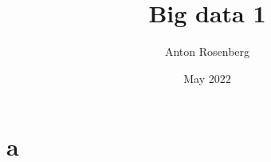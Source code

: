 \documentclass{article}
\title{Big data 1}
\author{Anton Rosenberg}
\date{May 2022}
\begin{document}
\maketitle
\newpage
\section{a}
\end{document}
